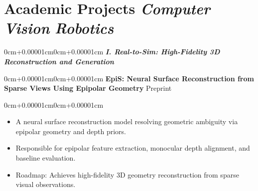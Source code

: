 \documentclass[10pt, letterpaper]{article}
\newenvironment{highlights}{\begin{itemize}[topsep=0.10cm,parsep=0.10cm,partopsep=0pt,itemsep=0pt,leftmargin=0cm+10pt]}{\end{itemize}}
\newenvironment{onecolentry}{\begin{adjustwidth}{0cm+0.00001cm}{0cm+0.00001cm}}{\end{adjustwidth}}
\begin{document}
    \newcommand{\cvdot}{\textcolor{MacaronRed}{\raisebox{1pt}{\scalebox{0.65}{\faCircle}}}}
    \newcommand{\robdot}{\textcolor{MacaronBlue}{\raisebox{1pt}{\scalebox{0.65}{\faCircle}}}}
    
    \section{Academic Projects \hfill \normalfont\normalsize\cvdot\hspace{3pt}\textit{Computer Vision} \hspace{1.5em} \robdot\hspace{3pt}\textit{Robotics}}

    \vspace{0.1cm}
    \begin{onecolentry}
        \textbf{\textit{I. Real-to-Sim: High-Fidelity 3D Reconstruction and Generation}}
    \end{onecolentry}
    \vspace{0.1cm}

    \begin{onecolentry}
        \textbf{EpiS: Neural Surface Reconstruction from Sparse Views Using Epipolar Geometry} \hfill Preprint
    \end{onecolentry}
    \begin{onecolentry}
        \begin{highlights}
        \item A neural surface reconstruction model resolving geometric ambiguity via epipolar geometry and depth priors.
        \item Responsible for epipolar feature extraction, monocular depth alignment, and baseline evaluation.
        \item Roadmap: Achieves high-fidelity 3D geometry reconstruction from sparse visual observations.\hspace{4pt}\cvdot
        \end{highlights}
    \end{onecolentry}

    \vspace{0.15cm}
\end{document}

